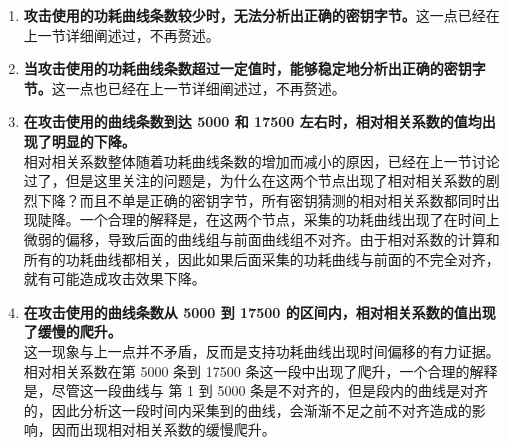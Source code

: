 \begin{enumerate}
    \item \textbf{攻击使用的功耗曲线条数较少时，无法分析出正确的密钥字节。}这一点已经在上一节详细阐述过，不再赘述。
    \item \textbf{当攻击使用的功耗曲线条数超过一定值时，能够稳定地分析出正确的密钥字节。}这一点也已经在上一节详细阐述过，不再赘述。
    \item \textbf{在攻击使用的曲线条数到达 5000 和 17500 左右时，相对相关系数的值均出现了明显的下降。}\\
    相对相关系数整体随着功耗曲线条数的增加而减小的原因，已经在上一节讨论过了，但是这里关注的问题是，为什么在这两个节点出现了相对相关系数的剧烈下降？而且不单是正确的密钥字节，所有密钥猜测的相对相关系数都同时出现陡降。一个合理的解释是，在这两个节点，采集的功耗曲线出现了在时间上微弱的偏移，导致后面的曲线组与前面曲线组不对齐。由于相对系数的计算和所有的功耗曲线都相关，因此如果后面采集的功耗曲线与前面的不完全对齐，就有可能造成攻击效果下降。
    \item \textbf{在攻击使用的曲线条数从 5000 到 17500 的区间内，相对相关系数的值出现了缓慢的爬升。}\\
    这一现象与上一点并不矛盾，反而是支持功耗曲线出现时间偏移的有力证据。相对相关系数在第 5000 条到 17500 条这一段中出现了爬升，一个合理的解释是，尽管这一段曲线与 第 1 到 5000 条是不对齐的，但是段内的曲线是对齐的，因此分析这一段时间内采集到的曲线，会渐渐不足之前不对齐造成的影响，因而出现相对相关系数的缓慢爬升。

\end{enumerate}

